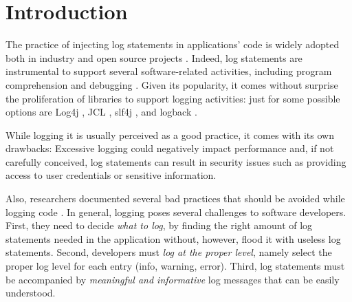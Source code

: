 \section{Introduction} \label{sec:intro}



The practice of injecting log statements in applications' code is widely adopted both in industry and open source projects \cite{oliner2012advances}. Indeed, log statements are instrumental to support several software-related activities, including program comprehension and debugging \cite{lu2017log,gurumdimma2016crude}. Given its popularity, it comes without surprise the proliferation of libraries to support logging activities: just for \java some possible options are Log4j \cite{log4j}, JCL \cite{jcl}, slf4j \cite{slf4j}, and logback \cite{logback}.

While logging it is usually perceived as a good practice, it comes with its own drawbacks: Excessive logging could negatively impact performance and, if not carefully conceived, log statements can result in security issues such as providing access to user credentials or sensitive information. 

Also, researchers documented several bad practices that should be avoided while logging code \cite{Chen:icse2017,Li:icse2019}. 
In general, logging poses several challenges to software developers. First, they need to decide \emph{what to log}, by finding the right amount of log statements needed in the application without, however, flood it with useless log statements. Second, developers must \emph{log at the proper level}, namely select the proper log level for each entry (\eg info, warning, error). Third, log statements must be accompanied by \emph{meaningful and informative} log messages that can be easily understood. 

